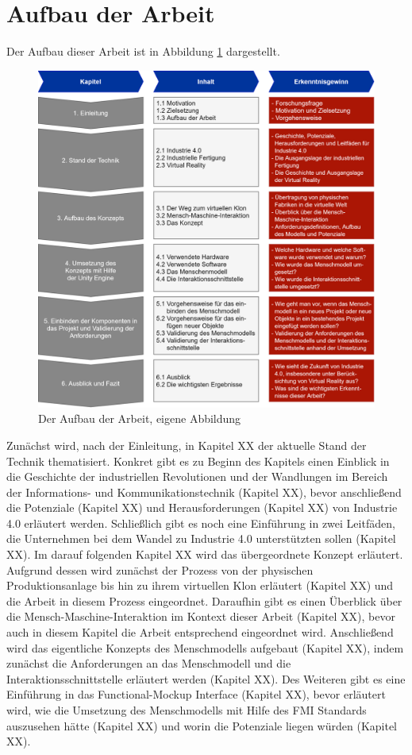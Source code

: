 \section{Aufbau der Arbeit}\label{sec:AufbauDerArbeit}
Der Aufbau dieser Arbeit ist in Abbildung \ref{fig:AufbauDerArbeit} dargestellt.
\begin{figure}[h]
	\centering
	\includegraphics[width=1\linewidth]{Bilder/A55_AufbauNeu}
	\caption{Der Aufbau der Arbeit, eigene Abbildung}
	\label{fig:AufbauDerArbeit}
\end{figure}
\newline
Zunächst wird, nach der Einleitung, in Kapitel XX der aktuelle Stand der Technik thematisiert. Konkret gibt es zu Beginn des Kapitels einen Einblick in die Geschichte der industriellen Revolutionen und der Wandlungen im Bereich der Informations- und Kommunikationstechnik (Kapitel XX), bevor anschließend die Potenziale (Kapitel XX) und Herausforderungen (Kapitel XX) von Industrie 4.0 erläutert werden. Schließlich gibt es noch eine Einführung in zwei Leitfäden, die Unternehmen bei dem Wandel zu Industrie 4.0 unterstützten sollen (Kapitel XX).
\newline
Im darauf folgenden Kapitel XX wird das übergeordnete Konzept erläutert. Aufgrund dessen wird zunächst der Prozess von der physischen Produktionsanlage bis hin zu ihrem virtuellen Klon erläutert (Kapitel XX) und die Arbeit in diesem Prozess eingeordnet. Daraufhin gibt es einen Überblick über die Mensch-Maschine-Interaktion im Kontext dieser Arbeit (Kapitel XX), bevor auch in diesem Kapitel die Arbeit entsprechend eingeordnet wird. Anschließend wird das eigentliche Konzepts des Menschmodells aufgebaut (Kapitel XX), indem zunächst die Anforderungen an das Menschmodell und die Interaktionsschnittstelle erläutert werden (Kapitel XX). Des Weiteren gibt es eine Einführung in das Functional-Mockup Interface (Kapitel XX), bevor erläutert wird, wie die Umsetzung des Menschmodells mit Hilfe des FMI Standards auszusehen hätte (Kapitel XX) und worin die Potenziale liegen würden (Kapitel XX).
